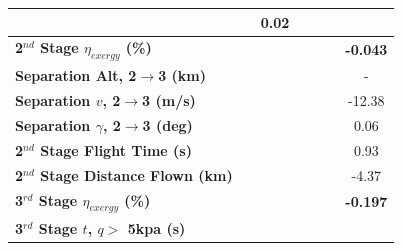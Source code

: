 \begin{table}[ht!]
\begin{tabular}{l c c c c c c}
		& \firstsecondSeparationgammaCdOneHundredTenNoReturn
		&0.02
		\\
		\hline 
		\textbf{2$^{nd}$ Stage $\eta_{exergy}$ (\%)}
		& \textbf{\secondExergyEffCdNinetyNoReturn}
		& \textbf{\secondExergyEffCdNinetyFiveNoReturn}
		& \textbf{\secondExergyEffCdStandardNoReturn}
		& \textbf{\secondExergyEffCdOneHundredFiveNoReturn}
		& \textbf{\secondExergyEffCdOneHundredTenNoReturn}
		& \textbf{-0.043}
		\\
		\textbf{Separation Alt, 2$\rightarrow$3 (km)}
		& \secondthirdSeparationAltCdNinetyNoReturn
		& \secondthirdSeparationAltCdNinetyFiveNoReturn
		& \secondthirdSeparationAltCdStandardNoReturn
		& \secondthirdSeparationAltCdOneHundredFiveNoReturn
		& \secondthirdSeparationAltCdOneHundredTenNoReturn
		& -
		\\
		\textbf{Separation $v$, 2$\rightarrow$3 (m/s)}
		& \secondthirdSeparationvCdNinetyNoReturn
		& \secondthirdSeparationvCdNinetyFiveNoReturn
		& \secondthirdSeparationvCdStandardNoReturn
		& \secondthirdSeparationvCdOneHundredFiveNoReturn
		& \secondthirdSeparationvCdOneHundredTenNoReturn
		&-12.38
		\\
		\textbf{Separation $\gamma$, 2$\rightarrow$3 (deg)}
		& \secondthirdSeparationgammaCdNinetyNoReturn
		& \secondthirdSeparationgammaCdNinetyFiveNoReturn
		& \secondthirdSeparationgammaCdStandardNoReturn
		& \secondthirdSeparationgammaCdOneHundredFiveNoReturn
		& \secondthirdSeparationgammaCdOneHundredTenNoReturn
		&0.06
		\\
		\textbf{2$^{nd}$ Stage Flight Time (s)}
		& \secondFlightTimeCdNinetyNoReturn
		& \secondFlightTimeCdNinetyFiveNoReturn
		& \secondFlightTimeCdStandardNoReturn
		& \secondFlightTimeCdOneHundredFiveNoReturn
		& \secondFlightTimeCdOneHundredTenNoReturn
		&0.93
		\\
		\textbf{2$^{nd}$ Stage Distance Flown (km)}
		& \SecondDistCdNinetyNoReturn
		& \SecondDistCdNinetyFiveNoReturn
		& \SecondDistCdStandardNoReturn
		& \SecondDistCdOneHundredFiveNoReturn
		& \SecondDistCdOneHundredTenNoReturn
		&-4.37
		\\
		\hline 
		\textbf{3$^{rd}$ Stage $\eta_{exergy}$ (\%)}
		& \textbf{\thirddExergyEffCdNinetyNoReturn}
		& \textbf{\thirddExergyEffCdNinetyFiveNoReturn}
		& \textbf{\thirddExergyEffCdStandardNoReturn}
		& \textbf{\thirddExergyEffCdOneHundredFiveNoReturn}
		& \textbf{\thirddExergyEffCdOneHundredTenNoReturn}
		& \textbf{-0.197}
		\\
		\textbf{3$^{rd}$ Stage $t$, $q >$ 5kpa (s)}
		& \thirdqOverFiveCdNinetyNoReturn
		& \thirdqOverFiveCdNinetyFiveNoReturn

\end{tabular}
\end{table}
